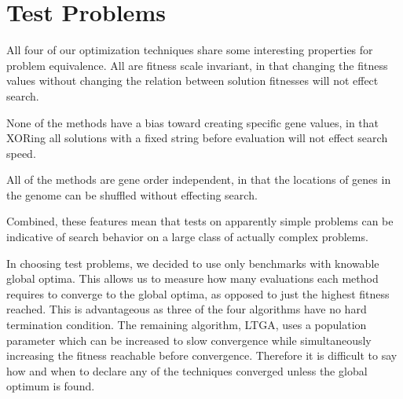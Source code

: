 \documentclass{sig-alternate}
\begin{document}
\section{Test Problems}
All four of our optimization techniques share some interesting properties for
problem equivalence.  All are fitness scale invariant, in that changing
the fitness values without changing the relation between solution fitnesses will not effect search.
\begin{comment}This is true because none of the methods
uses the fitness values directly, only when comparing the relative fitness between
two solutions using boolean operators.  This does not hold true for some optimization
methods, for instance fitness proportional selection.
\end{comment}
None of the methods have a bias toward creating specific gene values, in that
XORing all solutions with a fixed string before evaluation will not effect search speed.
\begin{comment}
This means all of the optimizers
will have unchanged behavior if a problem's inputs are reflected or XOR'd with a fixed string.  As
an example, the problem of \emph{maximize the number of ones} in a solution will be treated identically
to the problem of \emph{maximize the number of zeros} in a solution.  Both are also identical
to the problem of minimizing the hamming distance to any arbitrary solution.
\end{comment}
All of the methods are gene order independent, in that the locations of genes
in the genome can be shuffled without effecting search.
\begin{comment}
This means that the location
of genes in the genome can be randomly shuffled without effecting search behavior.
This is not true in many evolutionary systems due to crossover.  For example,
when using one point crossover the distance between genes in the genome effects the
probability they will be kept together through a crossover.
\end{comment}
Combined, these features mean that tests on apparently simple problems can be
indicative of search behavior on a large class of actually complex problems.

In choosing test problems, we decided to use only benchmarks with knowable global
optima.  This allows us to measure how many evaluations each method requires to converge to the
global optima, as opposed to just the highest fitness reached.  This is advantageous
as three of the four algorithms have no hard termination condition.  The remaining
algorithm, LTGA, uses a population parameter which can be increased to slow
convergence while simultaneously increasing the fitness reachable before convergence.
Therefore it is difficult to say how and when to declare any of the techniques
converged unless the global optimum is found.
\end{document}
